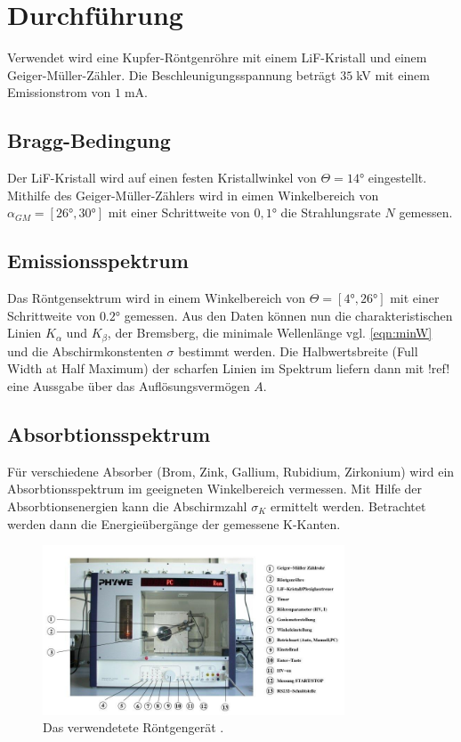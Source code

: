 \newpage
\section{Durchführung}
Verwendet wird eine Kupfer-Röntgenröhre mit einem LiF-Kristall und einem
Geiger-Müller-Zähler. Die Beschleunigungsspannung beträgt $35\;$kV mit
einem Emissionstrom von $1\;$mA.

\subsection{Bragg-Bedingung}
Der LiF-Kristall wird auf einen festen Kristallwinkel von $\Theta=14$° 
eingestellt. Mithilfe des Geiger-Müller-Zählers wird in eimen Winkelbereich
von $\alpha_{GM}=[26°,30°]$ mit einer Schrittweite von $0,1$° die Strahlungsrate $N$
gemessen.

\subsection{Emissionsspektrum}
Das Röntgensektrum wird in einem Winkelbereich von $\Theta=[4°,26°]$
mit einer Schrittweite von $0.2$°  gemessen. 
Aus den Daten können nun die charakteristischen Linien 
$K_{\alpha}$ und $K_{\beta}$, der Bremsberg, die minimale
Wellenlänge vgl. \ref{eqn:minW} und die Abschirmkonstenten $\sigma$ bestimmt werden.
Die Halbwertsbreite (Full Width at Half Maximum) der scharfen Linien 
im Spektrum liefern dann mit !ref! eine Aussgabe über das Auflösungsvermögen $A$.
\subsection{Absorbtionsspektrum}
Für verschiedene Absorber (Brom, Zink, Gallium, Rubidium, Zirkonium)
wird ein Absorbtionsspektrum im geeigneten Winkelbereich vermessen.
Mit Hilfe der Absorbtionsenergien kann die Abschirmzahl $\sigma_K$ 
ermittelt werden.
Betrachtet werden dann die Energieübergänge der gemessene K-Kanten. 
\begin{figure}
    \centering
    \includegraphics[width=0.8\textwidth]{plots/Apperatur.jpg}
    \caption{Das verwendetete Röntgengerät \cite[4]{anleitung}.}
\end{figure}




\label{sec:Durchfuehrung}

